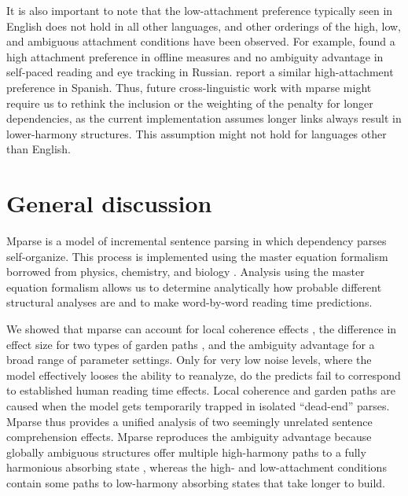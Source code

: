 \documentclass[a4paper, 12pt]{article}
\begin{document}
It is also important to note that the low-attachment preference typically seen
in English does not hold in all other languages, and other orderings of the
high, low, and ambiguous attachment conditions have been observed. For example,
\citet{chernova2015syntactic} found a high attachment preference in offline
measures and no ambiguity advantage in self-paced reading and eye tracking in
Russian. \cite{cuetos1988cross} report a similar high-attachment preference in
Spanish. Thus, future cross-linguistic work with mparse might require us to
rethink the inclusion or the weighting of the penalty for longer dependencies, as
the current implementation assumes longer links always result in lower-harmony
structures. This assumption might not hold for languages other than English.

\section{General discussion}
Mparse is a model of incremental sentence parsing in which dependency parses
self-organize. This process is implemented using the master equation formalism
borrowed from physics, chemistry, and biology \citep{oppenheim1977stochastic,
    vankampen2007stochastic, iyer-biswas2016first}. Analysis using the master
equation formalism allows us to determine analytically how probable different
structural analyses are and to make word-by-word reading time predictions. 

We showed that mparse can account for local coherence effects
\citep{tabor2004effects}, the difference in effect size for two types of garden
paths \citep{sturt1999structural}, and the ambiguity advantage
\citep{traxler1998adjunct} for a broad range of parameter settings. Only for
very low noise levels, where the model effectively looses the ability to
reanalyze, do the predicts fail to correspond to established human reading time
effects. Local coherence and garden paths are caused when the model gets
temporarily trapped in isolated ``dead-end'' parses. Mparse thus provides a
unified analysis of two seemingly unrelated sentence comprehension effects.
Mparse reproduces the ambiguity advantage because globally ambiguous structures
offer multiple high-harmony paths to a fully harmonious absorbing state
\citep[similar to the URM;][]{vangompel2000unrestricted}, whereas the high- and
low-attachment conditions contain some paths to low-harmony absorbing states
that take longer to build.
\end{document}

